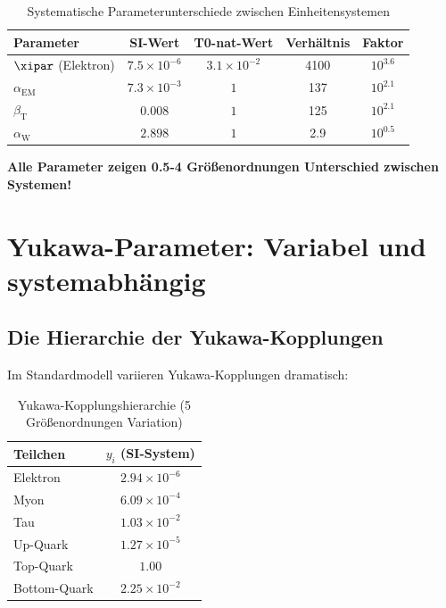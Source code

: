 	\begin{table}[htbp]
		\centering
		\begin{tabular}{lcccc}
			\toprule
			\textbf{Parameter} & \textbf{SI-Wert} & \textbf{T0-nat-Wert} & \textbf{Verhältnis} & \textbf{Faktor} \\
			\midrule
			$\xipar$ (Elektron) & $7.5 \times 10^{-6}$ & $3.1 \times 10^{-2}$ & 4100 & $10^{3.6}$ \\
			$\alpha_{\text{EM}}$ & $7.3 \times 10^{-3}$ & $1$ & 137 & $10^{2.1}$ \\
			$\beta_{\text{T}}$ & $0.008$ & $1$ & 125 & $10^{2.1}$ \\
			$\alpha_{\text{W}}$ & $2.898$ & $1$ & 2.9 & $10^{0.5}$ \\
			\bottomrule
		\end{tabular}
		\caption{Systematische Parameterunterschiede zwischen Einheitensystemen}
		\label{tab:parameter_vergleich}
	\end{table}
	
	\textbf{Alle Parameter zeigen 0.5-4 Größenordnungen Unterschied zwischen Systemen!}
	
	\section{Yukawa-Parameter: Variabel und systemabhängig}
	\label{sec:yukawa_parameter}
	
	\subsection{Die Hierarchie der Yukawa-Kopplungen}
	\label{subsec:yukawa_hierarchie}
	
	Im Standardmodell variieren Yukawa-Kopplungen dramatisch:
	
	\begin{table}[htbp]
		\centering
		\begin{tabular}{lc}
			\toprule
			\textbf{Teilchen} & \textbf{$y_i$ (SI-System)} \\
			\midrule
			Elektron & $2.94 \times 10^{-6}$ \\
			Myon & $6.09 \times 10^{-4}$ \\
			Tau & $1.03 \times 10^{-2}$ \\
			Up-Quark & $1.27 \times 10^{-5}$ \\
			Top-Quark & $1.00$ \\
			Bottom-Quark & $2.25 \times 10^{-2}$ \\
			\bottomrule
		\end{tabular}
		\caption{Yukawa-Kopplungshierarchie (5 Größenordnungen Variation)}
		\label{tab:yukawa_hierarchie}
	\end{table}
	
